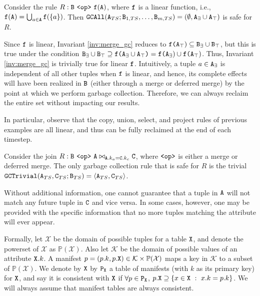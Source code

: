 \begin{example}[Linear GC]
Consider the rule $R: \tt{B} ~\tt{<op>}~ \tt{f}(\tt{A})$, where $\tt{f}$ is a linear function, i.e., $\tt{f}(\tt{A}) = \bigcup_{a\in \tt{A}} \tt{f}(\{a\})$.
Then $\tt{GCAll}(\tt{A}_{TS}; \tt{B}_{1,TS}, \dots, \tt{B}_{m,TS}) = (\emptyset, \tt{A}_\exists \cup \tt{A}_\top)$ is safe for $R$.
\end{example}
Since $\tt{f}$ is linear, Invariant \ref{inv:merge_gc} reduces to $\tt{f}\tt{(}\tt{A}_\top\tt{}) \subseteq \tt{B}_\exists \cup \tt{B}_\top$, but this is true under the condition $\tt{B}_\exists \cup \tt{B}_\top \supseteq \tt{f}\tt{(}\tt{A}_{\exists} \cup \tt{A}_{\top}\tt{)} = \tt{f}\tt{(}\tt{A}_\exists\tt{}) \cup \tt{f}\tt{(}\tt{A}_\top\tt{})$.
Thus, Invariant \ref{inv:merge_gc} is trivially true for linear $\tt{f}$.
Intuitively, a tuple $a \in \tt{A}_\exists$ is independent of all other tuples when $\tt{f}$ is linear, and hence, its complete effects will have been realized in $\tt{B}$ (either through a merge or deferred merge) by the point at which we perform garbage collection.
Therefore, we can always reclaim the entire set without impacting our results.

In particular, observe that the copy, union, select, and project rules of previous examples are all linear, and thus can be fully reclaimed at the end of each timestep.

\begin{example}[Join GC]
\label{ex:join_gc_no_manifests}
Consider the join $R: \tt{B} ~\tt{<op>}~ \tt{A} \bowtie_{\tt{A}.k_a = \tt{C}.k_c} \tt{C}$, where $\tt{<op>}$ is either a merge or deferred merge.
The only garbage collection rule that is safe for $R$ is the trivial $\tt{GCTrivial}(\tt{A}_{TS}, \tt{C}_{TS}; \tt{B}_{TS}) = \langle \tt{A}_{TS}, \tt{C}_{TS} \rangle$.
\end{example}
Without additional information, one cannot guarantee that a tuple in $\tt{A}$ will not match any future tuple in $\tt{C}$ and vice versa.
In some cases, however, one may be provided with the specific information that no more tuples matching the attribute will ever appear.

Formally, let $\mathcal{X}$ be the domain of possible tuples for a table $\tt{X}$, and denote the powerset of $\mathcal{X}$ as $\mathbb{P}(\mathcal{X})$.
Also let $\mathcal{K}$ be the domain of possible values of an attribute $\tt{X}.k$.
A manifest $p = (p.k, p.\tt{X}) \in \mathcal{K} \times \mathbb{P}(\mathcal{X})$ maps a key in $\mathcal{K}$ to a subset of $\mathbb{P}(\mathcal{X})$.
We denote by $\tt{X}$ by $\tt{P}_\tt{X}$ a table of manifests (with $k$ as its primary key) for $\tt{X}$, and say it is consistent with $\tt{X}$ if $\forall p \in \tt{P}_\tt{X}$, $p.\tt{X} \supseteq \{x \in \tt{X} ~:~ x.k = p.k\}$.
We will always assume that manifest tables are always consistent.

